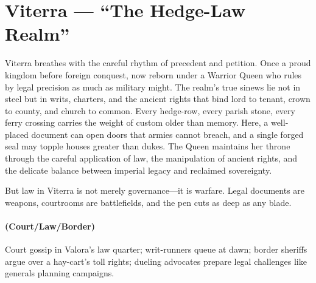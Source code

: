 \section{Viterra --- ``The Hedge-Law Realm''}
\label{chap:viterra}

\begin{tcolorbox}[colback=black!3,colframe=black!40!white,title={Theme \& Atmosphere}]
Viterra breathes with the careful rhythm of precedent and petition. Once a proud kingdom before foreign conquest, now reborn under a Warrior Queen who rules by legal precision as much as military might. The realm's true sinews lie not in steel but in writs, charters, and the ancient rights that bind lord to tenant, crown to county, and church to common. Every hedge-row, every parish stone, every ferry crossing carries the weight of custom older than memory. Here, a well-placed document can open doors that armies cannot breach, and a single forged seal may topple houses greater than dukes. The Queen maintains her throne through the careful application of law, the manipulation of ancient rights, and the delicate balance between imperial legacy and reclaimed sovereignty.

But law in Viterra is not merely governance—it is warfare. Legal documents are weapons, courtrooms are battlefields, and the pen cuts as deep as any blade.
\end{tcolorbox}

\paragraph*{(Court/Law/Border)} Court gossip in Valora's law quarter; writ-runners queue at dawn; border sheriffs argue over a hay-cart's toll rights; dueling advocates prepare legal challenges like generals planning campaigns.

